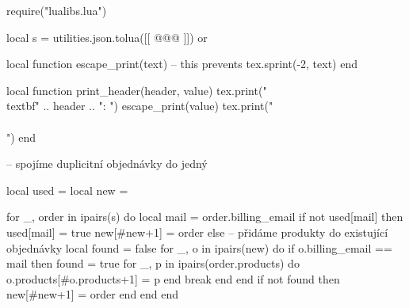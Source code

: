 \documentclass[landscape,a4page]{article}
\begin{document}
\columnseprule=0.3pt
\columnsep=20pt
\parindent=0pt
\parskip=2pt
\newcommand\printline[2]{\parbox{.2\linewidth}{#1}~\parbox{.7\linewidth}{#2}\\}

\begin{multicols*}{3}
  \sloppy

\begin{luacode*}
require("lualibs.lua")

local s =  utilities.json.tolua([[
@@@
]]) or {}



local function escape_print(text)
  -- this prevents
  tex.sprint(-2, text)
end

local function print_header(header, value)
  tex.print("\\textbf{" .. header .. ":} ")
  escape_print(value)
  tex.print("\\\\")
end

-- spojíme duplicitní objednávky do jedný

local used = {}
local new = {}

for _, order in ipairs(s) do
  local mail = order.billing_email
  if not used[mail] then
    used[mail] = true
    new[#new+1] = order
  else
    -- přidáme produkty do existující objednávky
    local found = false
    for _, o in ipairs(new) do
      if o.billing_email == mail then
        found = true
        for _, p in ipairs(order.products) do
          o.products[#o.products+1] = p
        end
        break
      end
    end
    if not found then
      new[#new+1] = order
    end
  end
end



\end{luacode*}
\end{multicols*}
\end{document}
